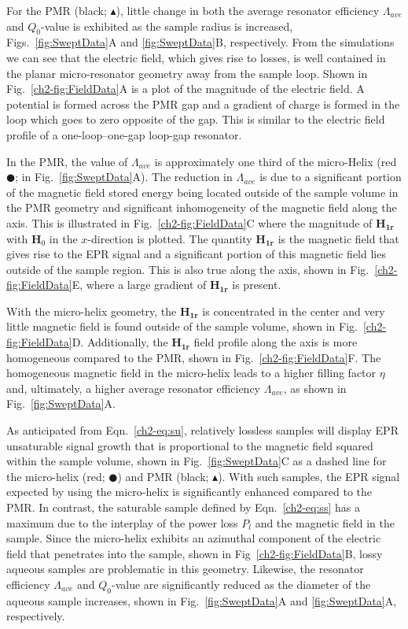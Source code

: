 For the PMR (black; $\blacktriangle$), little change in both the average resonator efficiency $\Lambda_{ave}$ and $Q_0$-value is exhibited as the sample radius is increased, Figs.~\ref{fig:SweptData}A and \ref{fig:SweptData}B, respectively. From the simulations we can see that the electric field, which gives rise to losses, is well contained in the planar micro-resonator geometry away from the sample loop. Shown in Fig.~\ref{ch2-fig:FieldData}A is a plot of the magnitude of the electric field. A potential is formed across the PMR gap and a gradient of charge is formed in the loop which goes to zero opposite of the gap. This is similar to the electric field profile of a one-loop--one-gap loop-gap resonator.  

In the PMR, the value of $\Lambda_{ave}$ is approximately one third of the micro-Helix (red $\CIRCLE$; in Fig.~\ref{fig:SweptData}A). The reduction in $\Lambda_{ave}$ is due to a significant portion of the magnetic field stored energy being located outside of the sample volume in the PMR geometry and significant inhomogeneity of the magnetic field along the axis. This is illustrated in Fig.~\ref{ch2-fig:FieldData}C where the magnitude of $\mathbf{H_{1r}}$ with $\mathbf{H}_0$ in the $x$-direction is plotted. The quantity $\mathbf{H_{1r}}$ is the magnetic field that gives rise to the EPR signal and a significant portion of this magnetic field lies outside of the sample region. This is also true along the axis, shown in Fig.~\ref{ch2-fig:FieldData}E, where a large gradient of $\mathbf{H_{1r}}$ is present. 

With the micro-helix geometry, the $\mathbf{H_{1r}}$ is concentrated in the center and very little magnetic field is found outside of the sample volume, shown in Fig.~\ref{ch2-fig:FieldData}D. Additionally, the $\mathbf{H_{1r}}$ field profile along the axis is more homogeneous compared to the PMR, shown in  Fig.~\ref{ch2-fig:FieldData}F. The homogeneous magnetic field in the micro-helix leads to a higher filling factor $\eta$ and, ultimately, a higher average resonator efficiency $\Lambda_{ave}$, as shown in Fig.~\ref{fig:SweptData}A.

As anticipated from Eqn.~\ref{ch2-eq:su}, relatively lossless samples will display EPR unsaturable signal growth that is proportional to the magnetic field squared within the sample volume, shown in Fig.~\ref{fig:SweptData}C as a dashed line for the micro-helix (red; $\CIRCLE$) and PMR (black; $\blacktriangle$). With such samples, the EPR signal expected by using the micro-helix is significantly enhanced compared to the PMR. In contrast, the saturable sample defined by  Eqn.~\ref{ch2-eq:ss} has a maximum due to the interplay of the power loss $P_l$ and the magnetic field in the sample. Since the micro-helix exhibits an azimuthal component of the electric field that penetrates into the sample, shown in Fig~\ref{ch2-fig:FieldData}B, lossy aqueous samples are problematic in this geometry. Likewise, the  resonator efficiency $\Lambda_{ave}$ and $Q_0$-value are significantly reduced as the diameter of the aqueous sample increases, shown in Fig.~\ref{fig:SweptData}A and \ref{fig:SweptData}A, respectively.

